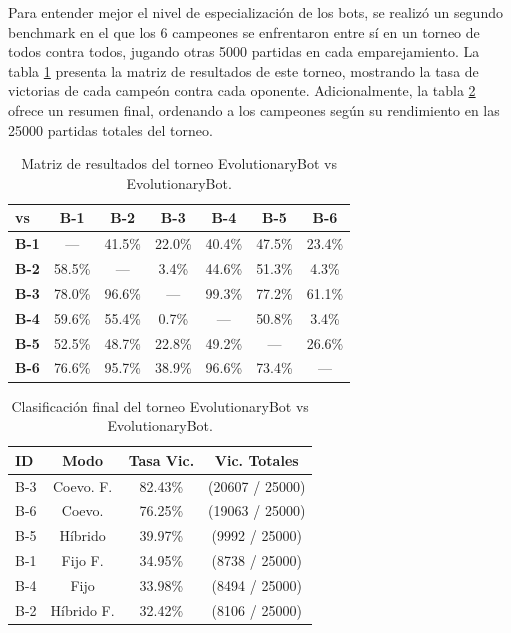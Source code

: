 Para entender mejor el nivel de especialización de los bots, se realizó un segundo benchmark en el que los 6 campeones se enfrentaron entre sí en un torneo de todos contra todos, jugando otras 5000 partidas en cada emparejamiento. La tabla \ref{tab:coevo_benchmark_resultados} presenta la matriz de resultados de este torneo, mostrando la tasa de victorias de cada campeón contra cada oponente. Adicionalmente, la tabla \ref{tab:coevo_ranking_final} ofrece un resumen final, ordenando a los campeones según su rendimiento en las 25000 partidas totales del torneo.

\begin{table}[H]
	\centering
	\caption{Matriz de resultados del torneo EvolutionaryBot vs EvolutionaryBot.}
	\label{tab:coevo_benchmark_resultados}
	\begin{tabular}{@{}lcccccc@{}}
		\toprule
		\textbf{vs}  & \textbf{B-1} & \textbf{B-2} & \textbf{B-3} & \textbf{B-4} & \textbf{B-5} & \textbf{B-6} \\
		\midrule
		\textbf{B-1} & ---          & 41.5\%       & 22.0\%       & 40.4\%       & 47.5\%       & 23.4\%       \\
		\textbf{B-2} & 58.5\%       & ---          & 3.4\%        & 44.6\%       & 51.3\%       & 4.3\%        \\
		\textbf{B-3} & 78.0\%       & 96.6\%       & ---          & 99.3\%       & 77.2\%       & 61.1\%       \\
		\textbf{B-4} & 59.6\%       & 55.4\%       & 0.7\%        & ---          & 50.8\%       & 3.4\%        \\
		\textbf{B-5} & 52.5\%       & 48.7\%       & 22.8\%       & 49.2\%       & ---          & 26.6\%       \\
		\textbf{B-6} & 76.6\%       & 95.7\%       & 38.9\%       & 96.6\%       & 73.4\%       & ---          \\
		\bottomrule
	\end{tabular}
\end{table}

\begin{table}[H]
	\centering
	\caption{Clasificación final del torneo EvolutionaryBot vs EvolutionaryBot.}
	\label{tab:coevo_ranking_final}
	\begin{tabular}{@{}lccc@{}}
		\toprule
		\textbf{ID} & \textbf{Modo} & \textbf{Tasa Vic.} & \textbf{Vic. Totales} \\
		\midrule
		B-3         & Coevo. F.     & 82.43\%            & (20607 / 25000)       \\
		B-6         & Coevo.        & 76.25\%            & (19063 / 25000)       \\
		B-5         & Híbrido       & 39.97\%            & (9992 / 25000)        \\
		B-1         & Fijo F.       & 34.95\%            & (8738 / 25000)        \\
		B-4         & Fijo          & 33.98\%            & (8494 / 25000)        \\
		B-2         & Híbrido F.    & 32.42\%            & (8106 / 25000)        \\
		\bottomrule
	\end{tabular}
\end{table}


